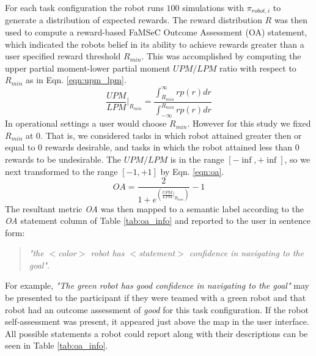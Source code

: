\documentclass[aaai]{article}
\begin{document}
For each task configuration the robot runs $100$ simulations with $\pi_{robot, i}$ to generate a distribution of expected rewards. The reward distribution $R$ was then used to compute a reward-based FaMSeC Outcome Assessment (OA) statement, which indicated the robots belief in its ability to achieve rewards greater than a user specified reward threshold $R_{min}$. This was accomplished by computing the upper partial moment-lower partial moment $UPM/LPM$ ratio with respect to $R_{min}$ as in Eqn. \ref{eqn:upm_lpm}.
\begin{equation}
    \frac{\textit{UPM}}{\textit{LPM}}|_{R_{min}} = \frac{\int_{R_{min}}^\infty r p(r) dr}{\int_{-\infty}^{R_{min}} r p(r) dr}
    \label{eqn:upm_lpm}
\end{equation}
In operational settings a user would choose $R_{min}$. However for this study we fixed $R_{min}$ at $0$. That is, we considered tasks in which robot attained greater then or equal to $0$ rewards desirable, and tasks in which the robot attained less than $0$ rewards to be undesirable. The $UPM/LPM$ is in the range $[-\inf, +\inf]$, so we next transformed to the range $[-1,+1]$ by Eqn. \ref{eqn:oa}.
 \begin{equation}
     \textit{OA} = \frac{2}{1+e^{\left(\frac{\textit{UPM}}{\textit{LPM}}|_{R_{min}}\right)}} - 1
     \label{eqn:oa}
 \end{equation}
The resultant metric \textit{OA} was then mapped to a semantic label according to the \textit{OA} statement column of Table \ref{tab:oa_info} and reported to the user in sentence form:
\begin{quote}
   \emph{"the $<$color$>$ robot has $<$statement$>$ confidence in navigating to the goal"}.
\end{quote}
For example, \emph{"The green robot has good confidence in navigating to the goal"} may be presented to the participant if they were teamed with a green robot and that robot had an outcome assessment of \textit{good} for this task configuration. If the robot self-assessment was present, it appeared just above the map in the user interface. All possible statements a robot could report along with their descriptions can be seen in Table \ref{tab:oa_info}.
\end{document}
